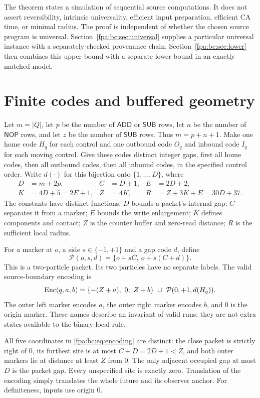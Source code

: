 \documentclass[11pt,a4paper]{article}
\numberwithin{equation}{section}
\newcommand{\ADD}{\mathsf{ADD}}\newcommand{\SUB}{\mathsf{SUB}}\newcommand{\NOP}{\mathsf{NOP}}\newcommand{\HALT}{\mathsf{HALT}}
\begin{document}
The theorem states a simulation of sequential source computations. It does
not assert reversibility, intrinsic universality, efficient input preparation,
efficient CA time, or minimal radius. The proof is independent of whether the
chosen source program is universal. Section~\ref{fpa:bc:sec:universal} supplies a
particular universal instance with a separately checked provenance chain.
Section~\ref{fpa:bc:sec:lower} then combines this upper bound with a separate lower
bound in an exactly matched model.

\section{Finite codes and buffered geometry}\label{fpa:bc:sec:geometry}
Let $m=|Q|$, let $p$ be the number of $\ADD$ or $\SUB$ rows, let $n$ be the
number of $\NOP$ rows, and let $z$ be the number of $\SUB$ rows. Thus
$m=p+n+1$. Make one home code $H_q$ for each control and one outbound code
$O_q$ and inbound code $I_q$ for each moving control. Give these codes distinct
integer gaps, first all home codes, then all outbound codes, then all inbound
codes, in the specified control order. Write $d(\cdot)$ for this bijection
onto $\{1,\ldots,D\}$, where
\begin{align}
D&=m+2p,& C&=D+1,&E&=2D+2,\label{fpa:bc:eq:constants1}\\
K&=4D+5=2E+1,&Z&=4K,&R&=Z+3K+E=30D+37.\label{fpa:bc:eq:constants2}
\end{align}
The constants have distinct functions. $D$ bounds a packet's internal gap;
$C$ separates it from a marker; $E$ bounds the write enlargement; $K$ defines
components and contact; $Z$ is the counter buffer and zero-read distance;
$R$ is the sufficient local radius.

For a marker at $o$, a side $s\in\{-1,+1\}$ and a gap code $d$, define
\[
 \mathcal P(o,s,d)=\{o+sC,\ o+s(C+d)\}.\label{fpa:bc:eq:pair}
\]
This is a two-particle packet. Its two particles have no separate labels.
The valid source-boundary encoding is
\begin{equation}
 \operatorname{Enc}(q,a,b)=\{-(Z+a),\ 0,\ Z+b\}\ \cup\ \mathcal P(0,+1,d(H_q)).
 \label{fpa:bc:eq:encoding}
\end{equation}
The outer left marker encodes $a$, the outer right marker encodes $b$, and
0 is the origin marker. These names describe an invariant of valid runs;
they are not extra states available to the binary local rule.

All five coordinates in \eqref{fpa:bc:eq:encoding} are distinct: the close packet is
strictly right of 0, its furthest site is at most $C+D=2D+1<Z$, and both outer
markers lie at distance at least $Z$ from 0. The only adjacent occupied gap
at most $D$ is the packet gap. Every unspecified site is exactly zero.
Translation of the encoding simply translates the whole future and its
observer anchor. For definiteness, inputs use origin 0.
\end{document}
